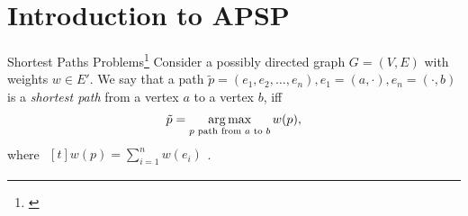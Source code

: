 \section{Introduction to APSP}

\begin{frame}{Shortest Paths Problems\footnote{\cite[Section~24]{Cormen2001}}}
    Consider a possibly directed graph $G = (V, E)$ with weights $w \in E'$.
    We say that a path $\tilde{p} = (e_1, e_2, \dots, e_n), e_1 = (a, \cdot), e_n = (\cdot, b)$ is a \emph{shortest path} from a vertex $a$ to a vertex $b$, iff
    \[
        \tilde{p} = \operatorname*{arg\,max}\limits_{p\text{ path from }a\text{ to }b} w(p),
    \]
    where $\begin{aligned}[t]w(p) = \sum\limits_{i = 1}^n w(e_i)\end{aligned}$.

\end{frame}

